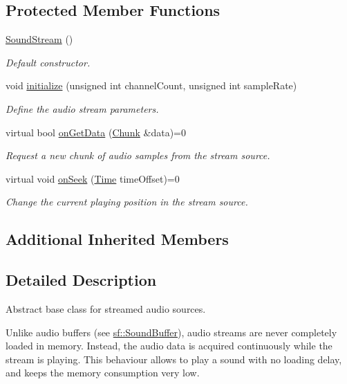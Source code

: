 \subsection*{Protected Member Functions}
\begin{DoxyCompactItemize}
\item 
\hyperlink{classsf_1_1_sound_stream_a769d08f4c3c6b4340ef3a838329d2e5c}{Sound\+Stream} ()
\begin{DoxyCompactList}\small\item\em Default constructor. \end{DoxyCompactList}\item 
void \hyperlink{classsf_1_1_sound_stream_a9c351711198ee1aa77c2fefd3ced4d2c}{initialize} (unsigned int channel\+Count, unsigned int sample\+Rate)
\begin{DoxyCompactList}\small\item\em Define the audio stream parameters. \end{DoxyCompactList}\item 
virtual bool \hyperlink{classsf_1_1_sound_stream_a968ec024a6e45490962c8a1121cb7c5f}{on\+Get\+Data} (\hyperlink{structsf_1_1_sound_stream_1_1_chunk}{Chunk} \&data)=0
\begin{DoxyCompactList}\small\item\em Request a new chunk of audio samples from the stream source. \end{DoxyCompactList}\item 
virtual void \hyperlink{classsf_1_1_sound_stream_a907036dd2ca7d3af5ead316e54b75997}{on\+Seek} (\hyperlink{classsf_1_1_time}{Time} time\+Offset)=0
\begin{DoxyCompactList}\small\item\em Change the current playing position in the stream source. \end{DoxyCompactList}\end{DoxyCompactItemize}
\subsection*{Additional Inherited Members}


\subsection{Detailed Description}
Abstract base class for streamed audio sources. 

Unlike audio buffers (see \hyperlink{classsf_1_1_sound_buffer}{sf\+::\+Sound\+Buffer}), audio streams are never completely loaded in memory. Instead, the audio data is acquired continuously while the stream is playing. This behaviour allows to play a sound with no loading delay, and keeps the memory consumption very low.

